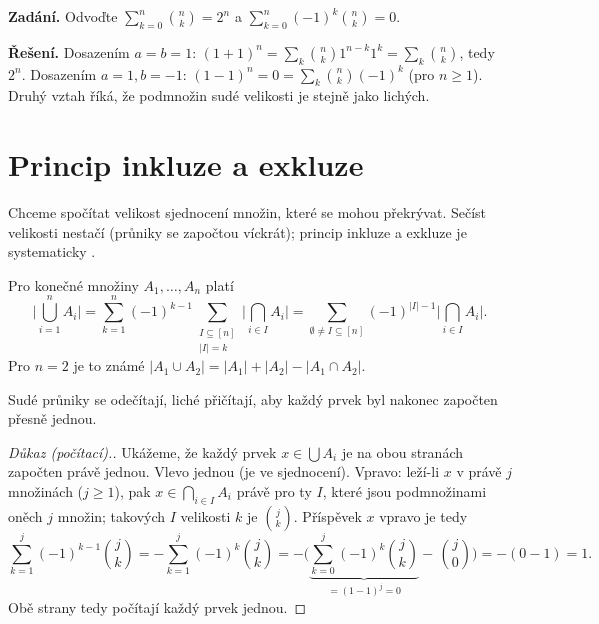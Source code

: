 \documentclass[11pt,a4paper]{article}
\begin{document}
\begin{priklad}
\textbf{Zadání.} Odvoďte $\sum_{k=0}^n\binom nk=2^n$ a $\sum_{k=0}^n(-1)^k\binom nk=0$.

\textbf{Řešení.} Dosazením $a=b=1$: $(1+1)^n=\sum_k\binom nk 1^{n-k}1^k=\sum_k\binom nk$, tedy $2^n$. Dosazením $a=1,b=-1$: $(1-1)^n=0=\sum_k\binom nk(-1)^k$ (pro $n\ge1$). Druhý vztah říká, že podmnožin sudé velikosti je stejně jako lichých.
\end{priklad}

\section{Princip inkluze a exkluze}\label{sec:ie}

Chceme spočítat velikost sjednocení množin, které se mohou překrývat. Sečíst velikosti nestačí (průniky se započtou víckrát); princip inkluze a exkluze je systematicky .

\begin{veta}
Pro konečné množiny $A_1,\dots,A_n$ platí
\[
\Big|\bigcup_{i=1}^{n}A_i\Big|
=\sum_{k=1}^{n}(-1)^{k-1}\!\!\sum_{\substack{I\subseteq[n]\\|I|=k}}\Big|\bigcap_{i\in I}A_i\Big|
=\sum_{\emptyset\neq I\subseteq[n]}(-1)^{|I|-1}\Big|\bigcap_{i\in I}A_i\Big|.
\]
Pro $n=2$ je to známé $|A_1\cup A_2|=|A_1|+|A_2|-|A_1\cap A_2|$.
\end{veta}

\begin{intuice}
 Sudé průniky se odečítají, liché přičítají, aby každý prvek byl nakonec započten přesně jednou.
\end{intuice}

\begin{proof}[Důkaz (počítací).]
Ukážeme, že každý prvek $x\in\bigcup A_i$ je na obou stranách započten právě jednou. Vlevo jednou (je ve sjednocení). Vpravo: leží-li $x$ v právě $j$ množinách ($j\ge1$), pak $x\in\bigcap_{i\in I}A_i$ právě pro ty $I$, které jsou podmnožinami oněch $j$ množin; takových $I$ velikosti $k$ je $\binom{j}{k}$. Příspěvek $x$ vpravo je tedy
\[
\sum_{k=1}^{j}(-1)^{k-1}\binom{j}{k}
=-\sum_{k=1}^{j}(-1)^{k}\binom{j}{k}
=-\Big(\underbrace{\sum_{k=0}^{j}(-1)^k\binom{j}{k}}_{=(1-1)^j=0}-\,\binom{j}{0}\Big)
=-(0-1)=1.
\]
Obě strany tedy počítají každý prvek jednou.
\end{proof}
\end{document}
